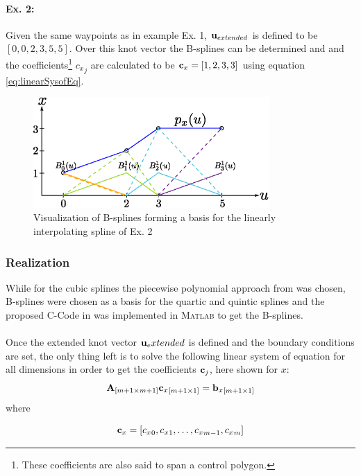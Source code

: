 \paragraph{Ex. 2:}
Given the same waypoints as in example Ex. 1, ${\bf u}_{extended}$ is defined to be $[0,0,2,3,5,5]$. Over this knot vector the B-splines can be determined and and the coefficients\footnote{These coefficients are also said to span a control polygon.} ${c_x}_j$ are calculated to be ${\bf c}_x=[1,2,3,3]$ using equation \eqref{eq:linearSysofEq}.

\begin{figure}[H]
	\centering
    \includegraphics[width = 0.8\textwidth]{graphics/BSpline.eps}
  \caption{Visualization of B-splines forming a basis for the linearly interpolating spline of Ex. 2}
  \label{fig:BSpline}
\end{figure} 

\subsubsection{Realization}
While for the cubic splines the piecewise polynomial approach from \cite{engeln} was chosen, B-splines were chosen as a basis for the quartic and quintic splines and the proposed C-Code in \cite{biagiotti} was implemented in \textsc{Matlab} to get the B-splines.\\
\\


Once the extended knot vector ${\bf u}_extended$ is defined and the boundary conditions are set, the only thing left is to solve the following linear system of equation for all dimensions in order to get the coefficients ${\bf c}_j$,  here shown for $x$:
\begin{equation}
\label{eq:linearSysofEq}
{\bf A}_{[m+1\times m+1] }{{\bf c}_x}_{[m+1\times 1]}={{\bf b}_x}_{[m+1 \times 1]}
\end{equation}
where


\begin{equation*}
    {\bf c}_x = [ {c_x}_{0}, {c_x}_{1}, \ldots, {c_x}_{m-1}, {c_x}_{m}]
\end{equation*}

